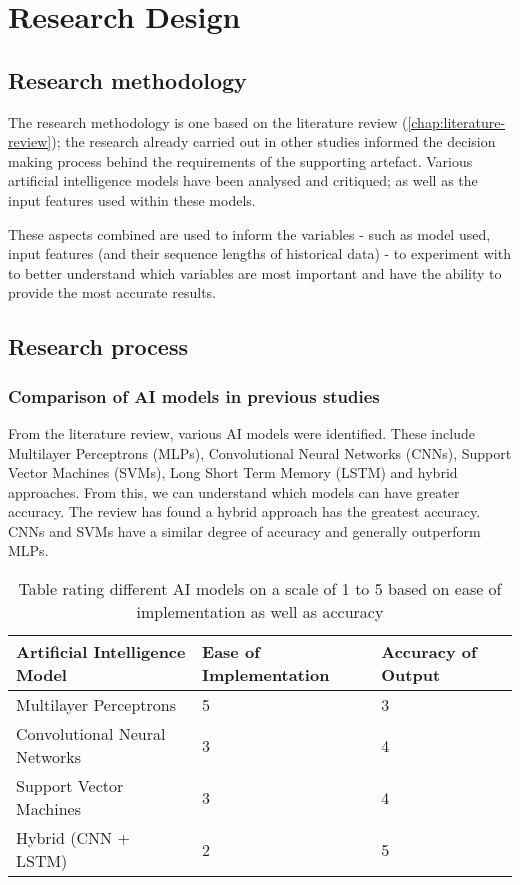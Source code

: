 \chapter{Research Design} \label{chap:research-design}
\section{Research methodology}
The research methodology is one based on the literature review (\autoref{chap:literature-review});
the research already carried out in other studies
informed the decision making process behind the requirements of the supporting artefact. Various artificial
intelligence models have been analysed and critiqued; as well as the input features used within these models.

These aspects combined are used to inform the variables - such as model used, input features
(and their sequence lengths of historical data) - to experiment with to better understand which variables are most important
and have the ability to provide the most accurate results.

\section{Research process}
\subsection{Comparison of AI models in previous studies}
From the literature review, various AI models were identified. These include Multilayer Perceptrons (MLPs),
Convolutional Neural Networks (CNNs), Support Vector Machines (SVMs), Long Short Term Memory (LSTM) and hybrid
approaches. From this, we can understand which models can have greater accuracy. The review has found a hybrid
approach has the greatest accuracy. CNNs and SVMs have a similar degree of accuracy and generally outperform MLPs.

\begin{table}[h]
    \centering
    \begin{tabular}{|p{50mm}|p{40mm}|p{35mm}|}
        \hline
        Artificial Intelligence Model & Ease of Implementation & Accuracy of Output \\
        \hline\hline
        Multilayer Perceptrons & 5 & 3 \\
        Convolutional Neural Networks & 3 & 4 \\
        Support Vector Machines & 3 & 4 \\
        Hybrid (CNN + LSTM) & 2 & 5 \\
        \hline
    \end{tabular}
    \caption[Table rating different AI models]{Table rating different AI models on a scale of 1 to 5 based on ease of implementation as well as accuracy}
    \label{tab:research_model_comparison}
\end{table}
\FloatBarrier

